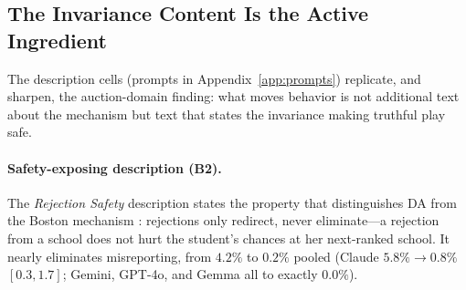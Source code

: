 \subsection{The Invariance Content Is the Active Ingredient}\label{app:da-descriptions}

The description cells (prompts in Appendix~\ref{app:prompts}) replicate, and sharpen, the auction-domain finding: what moves behavior is not additional text about the mechanism but text that states the invariance making truthful play safe.

\paragraph{Safety-exposing description (B2).} The \emph{Rejection Safety} description states the property that distinguishes DA from the Boston mechanism \citep{abdulkadirouglu2003school}: rejections only redirect, never eliminate---a rejection from a school does not hurt the student's chances at her next-ranked school. It nearly eliminates misreporting, from $4.2\%$ to $0.2\%$ pooled (Claude $5.8\% \to 0.8\%$ $[0.3, 1.7]$; Gemini, GPT-4o, and Gemma all to exactly $0.0\%$).

